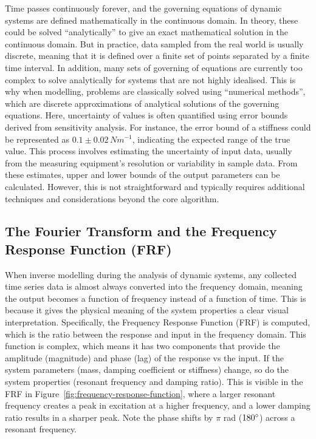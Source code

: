 \documentclass[12pt]{article}
\begin{document}
    Time passes continuously forever, and the governing equations of dynamic systems are defined mathematically in the continuous domain.
    In theory, these could be solved ``analytically'' to give an exact mathematical solution in the continuous domain.
    But in practice, data sampled from the real world is usually discrete, meaning that it is defined over a finite set of points separated by a finite time interval.
    In addition, many sets of governing of equations are currently too complex to solve analytically for systems that are not highly idealised.
    This is why when modelling, problems are classically solved using ``numerical methods'', which are discrete approximations of analytical solutions of the governing equations.
    Here, uncertainty of values is often quantified using error bounds derived from sensitivity analysis.
    For instance, the error bound of a stiffness could be represented as $0.1 \pm 0.02 \, Nm^{-1}$, indicating the expected range of the true value.
    This process involves estimating the uncertainty of input data, usually from the measuring equipment's resolution or variability in sample data.
    From these estimates, upper and lower bounds of the output parameters can be calculated.
    However, this is not straightforward and typically requires additional techniques and considerations beyond the core algorithm.


    \subsection{The Fourier Transform and the Frequency Response Function (FRF)}

    When inverse modelling during the analysis of dynamic systems, any collected time series data is almost always converted into the frequency domain, meaning the output becomes a function of frequency instead of a function of time.
    This is because it gives the physical meaning of the system properties a clear visual interpretation.
    Specifically, the Frequency Response Function (FRF) is computed, which is the ratio between the response and input in the frequency domain.
    This function is complex, which means it has two components that provide the amplitude (magnitude) and phase (lag) of the response vs the input.
    If the system parameters (mass, damping coefficient or stiffness) change, so do the system properties (resonant frequency and damping ratio).
    This is visible in the FRF in Figure~\ref{fig:frequency-response-function}, where a larger resonant frequency creates a peak in excitation at a higher frequency, and a lower damping ratio results in a sharper peak.
    Note the phase shifts by $\pi$ rad ($180\degree$) across a resonant frequency.
\end{document}
